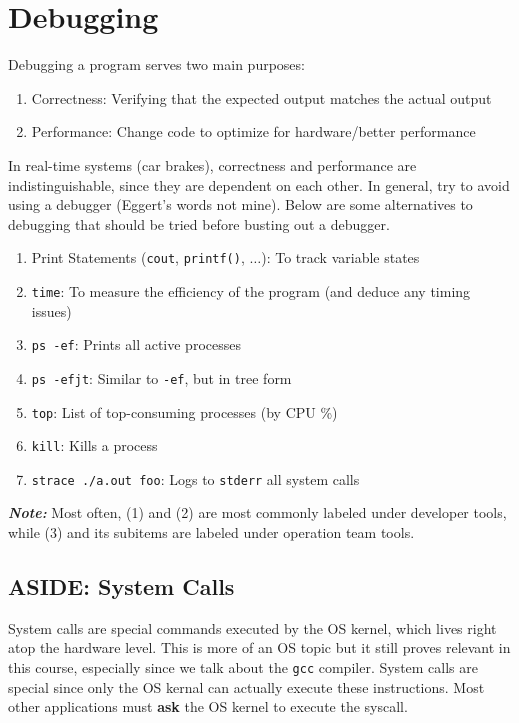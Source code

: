 \documentclass[13pt]{article}
\begin{document}
\section{Debugging}
Debugging a program serves two main purposes:
\begin{enumerate}[label=(\arabic*)]
\item Correctness: Verifying that the expected output matches the actual output
\item Performance: Change code to optimize for hardware/better performance
\end{enumerate}
In real-time systems (car brakes), correctness and performance are indistinguishable, since they are dependent on each other. In general, try to avoid using a debugger (Eggert's words not mine). Below are some alternatives to debugging that should be tried before busting out a debugger.
\begin{enumerate}[label=(\arabic*)]
\item Print Statements (\texttt{cout}, \texttt{printf()}, $\ldots$): To track variable states
\item \texttt{time}: To measure the efficiency of the program (and deduce any timing issues)
\item \texttt{ps -ef}: Prints all active processes
\item \texttt{ps -efjt}: Similar to \texttt{-ef}, but in tree form
\item \texttt{top}: List of top-consuming processes (by CPU \%)
\item \texttt{kill}: Kills a process
\item \texttt{strace ./a.out foo}: Logs to \texttt{stderr} all system calls
\end{enumerate}
\textit{\textbf{Note:}} Most often, (1) and (2) are most commonly labeled under developer tools, while (3) and its subitems are labeled under operation team tools.

\subsection*{ASIDE: System Calls}
System calls are special commands executed by the OS kernel, which lives right atop the hardware level. This is more of an OS topic but it still proves relevant in this course, especially since we talk about the \texttt{gcc} compiler. System calls are special since only the OS kernal can actually execute these instructions. Most other applications must \textbf{ask} the OS kernel to execute the syscall.
\end{document}
